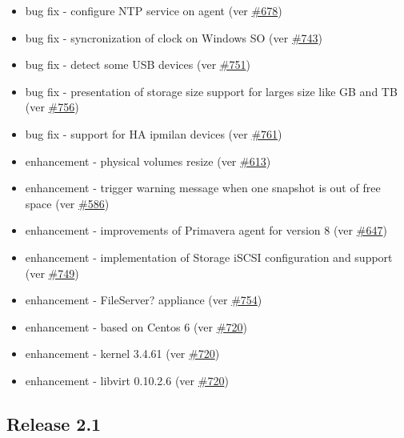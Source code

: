 \begin{itemize}
	\item bug fix - configure NTP service on agent (ver \href{https://srcmaster.eurotux.com/pm/p/etva/ticket/678}{\#678})
	\item bug fix - syncronization of clock on Windows SO (ver \href{https://srcmaster.eurotux.com/pm/p/etva/ticket/743}{\#743})
	\item bug fix - detect some USB devices (ver \href{https://srcmaster.eurotux.com/pm/p/etva/ticket/751}{\#751})
	\item bug fix - presentation of storage size support for larges size like GB and TB (ver \href{https://srcmaster.eurotux.com/pm/p/etva/ticket/756}{\#756})
	\item bug fix - support for HA ipmilan devices (ver \href{https://srcmaster.eurotux.com/pm/p/etva/ticket/761}{\#761})
	\item enhancement - physical volumes resize (ver \href{https://srcmaster.eurotux.com/pm/p/etva/ticket/613}{\#613})
	\item enhancement - trigger warning message when one snapshot is out of free space (ver \href{https://srcmaster.eurotux.com/pm/p/etva/ticket/586}{\#586})
	\item enhancement - improvements of Primavera agent for version 8 (ver \href{https://srcmaster.eurotux.com/pm/p/etva/ticket/647}{\#647})
	\item enhancement - implementation of Storage iSCSI configuration and support (ver \href{https://srcmaster.eurotux.com/pm/p/etva/ticket/749}{\#749})
	\item enhancement - FileServer? appliance (ver \href{https://srcmaster.eurotux.com/pm/p/etva/ticket/754}{\#754})
	\item enhancement - based on Centos 6 (ver \href{https://srcmaster.eurotux.com/pm/p/etva/ticket/720}{\#720})
	\item enhancement - kernel 3.4.61 (ver \href{https://srcmaster.eurotux.com/pm/p/etva/ticket/720}{\#720})
	\item enhancement - libvirt 0.10.2.6 (ver \href{https://srcmaster.eurotux.com/pm/p/etva/ticket/720}{\#720})
\end{itemize}

\subsection{Release 2.1}

